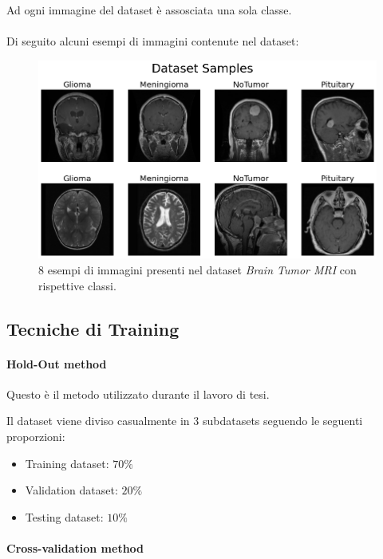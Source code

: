         Ad ogni immagine del dataset è assosciata una sola classe.\\\\
        \newpage
        Di seguito alcuni esempi di immagini contenute nel dataset:
            \begin{figure}[!h]
                \centering
                \includegraphics[width=\textwidth]{Images/Datasets/Brain Dataset Samples.png}
                \caption{8 esempi di immagini presenti nel dataset \textit{Brain Tumor MRI} con rispettive classi.}
                \label{Brain Samples}
            \end{figure}
        \newpage
        
    \subsection{Tecniche di Training}
            \paragraph{Hold-Out method}
            \label{Hold-Out method}
            Questo è il metodo utilizzato durante il lavoro di tesi.
            
            Il dataset viene diviso casualmente in 3 subdatasets seguendo le seguenti proporzioni:
                \begin{itemize}
                    \item Training dataset: $70\%$
                    \item Validation dataset: $20\%$
                    \item Testing dataset: $10\%$
                \end{itemize}
            
            \paragraph{Cross-validation method}
            
